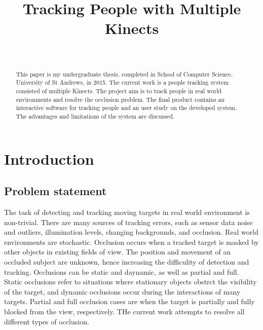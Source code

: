 \documentclass{sigchi}
\begin{document}
\title{Tracking People with Multiple Kinects}

\author{%
  \\
}

\maketitle

\begin{abstract}
This paper is my undergraduate thesis, completed in School of Computer Science, University of St Andrews, in 2015. The current work is a people tracking system consisted of multiple Kinects. The project aim is to track people in real world environments and resolve the occlusion problem. The final product contains an interactive software for tracking people and an user study on the developed system. The advantages and limitations of the system are discussed.
\end{abstract}



\section{Introduction}



\subsection{Problem statement}

The task of detecting and tracking moving targets in real world environment is non-trivial. There are many sources of tracking errors, such as sensor data noise and outliers, illumination levels, changing backgrounds, and occlusion. Real world environments are stochastic. Occlusion occurs when a tracked target is masked by other objects in existing fields of view. The position and movement of an occluded subject are unknown, hence increasing the difficulity of detection and tracking. Occlusions can be static and daynamic, as well as partial and full. Static occlusions refer to situations where stationary objects obstrct the visibility of the target, and dynamic occlusions occur during the interactions of many targets. Partial and full occlusion cases are when the target is partially and fully blocked from the view, respectively. THe current work attempts to resolve all different types of occlusion.
\end{document}

